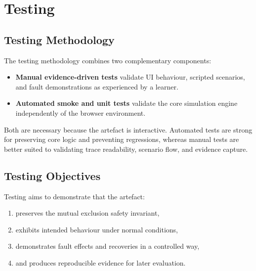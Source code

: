 \chapter{Testing}
\label{ch:testing}

\section{Testing Methodology}
The testing methodology combines two complementary components:
\begin{itemize}
  \item \textbf{Manual evidence-driven tests} validate UI behaviour, scripted scenarios, and fault demonstrations as experienced by a learner.
  \item \textbf{Automated smoke and unit tests} validate the core simulation engine independently of the browser environment.
\end{itemize}

Both are necessary because the artefact is interactive. Automated tests are strong for preserving core logic and preventing regressions, whereas manual tests are better suited to validating trace readability, scenario flow, and evidence capture.

\section{Testing Objectives}
Testing aims to demonstrate that the artefact:
\begin{enumerate}
  \item preserves the mutual exclusion safety invariant,
  \item exhibits intended behaviour under normal conditions,
  \item demonstrates fault effects and recoveries in a controlled way,
  \item and produces reproducible evidence for later evaluation.
\end{enumerate}

